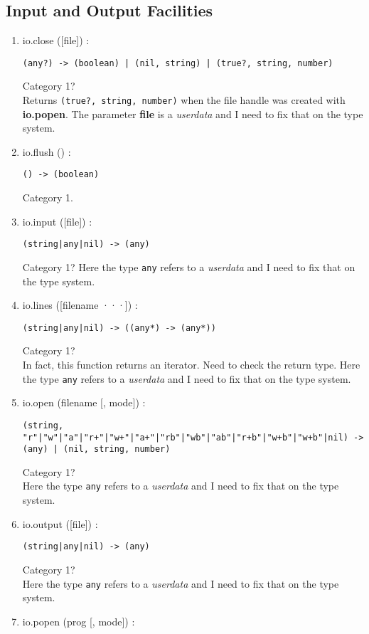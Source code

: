 \subsection{Input and Output Facilities}

\begin{enumerate}
\item io.close ([file]) :
\begin{verbatim}
(any?) -> (boolean) | (nil, string) | (true?, string, number)
\end{verbatim}
Category 1?
\\
Returns \texttt{(true?, string, number)} when the file handle
was created with \textbf{io.popen}.
The parameter \textbf{file} is a \textit{userdata} and I need
to fix that on the type system.
\item io.flush () :
\begin{verbatim}
() -> (boolean)
\end{verbatim}
Category 1.
\item io.input ([file]) :
\begin{verbatim}
(string|any|nil) -> (any)
\end{verbatim}
Category 1?
Here the type \texttt{any} refers to a \textit{userdata} and
I need to fix that on the type system.
\item io.lines ([filename ···]) :
\begin{verbatim}
(string|any|nil) -> ((any*) -> (any*))
\end{verbatim}
Category 1?
\\
In fact, this function returns an iterator. Need to check the return type.
Here the type \texttt{any} refers to a \textit{userdata} and
I need to fix that on the type system.
\item io.open (filename [, mode]) :
\begin{verbatim}
(string,
"r"|"w"|"a"|"r+"|"w+"|"a+"|"rb"|"wb"|"ab"|"r+b"|"w+b"|"w+b"|nil) ->
(any) | (nil, string, number)
\end{verbatim}
Category 1?
\\
Here the type \texttt{any} refers to a \textit{userdata} and
I need to fix that on the type system.
\item io.output ([file]) :
\begin{verbatim}
(string|any|nil) -> (any)
\end{verbatim}
Category 1?
\\
Here the type \texttt{any} refers to a \textit{userdata} and
I need to fix that on the type system.
\item io.popen (prog [, mode]) :

\end{enumerate}
